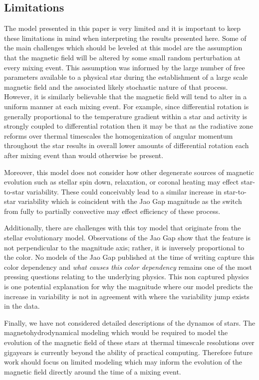 \subsection{Limitations}
The model presented in this paper is very limited and it is important to keep
these limitations in mind when interpreting the results presented here. Some of
the main challenges which should be leveled at this model are the assumption
that the magnetic field will be altered by some small random perturbation at
every mixing event. This assumption was informed by the large number of free
parameters available to a physical star during the establishment of a large
scale magnetic field and the associated likely stochastic nature of that
process. However, it is similarly believable that the magnetic field will tend
to alter in a uniform manner at each mixing event. For example, since
differential rotation is generally proportional to the temperature gradient
within a star and activity is strongly coupled to differential rotation then it
may be that as the radiative zone reforms over thermal timescales the
homogenization of angular momentum throughout the star results in overall lower
amounts of differential rotation each after mixing event than would otherwise
be present.

Moreover, this model does not consider how other degenerate sources of magnetic
evolution such as stellar spin down, relaxation, or coronal heating may effect
star-to-star variability. These could conceivably lead to a similar increase in
star-to-star variability which is coincident with the Jao Gap magnitude as the
switch from fully to partially convective may effect efficiency of these
process.

Additionally, there are challenges with this toy model that originate from the
stellar evolutionary model. Observations of the Jao Gap show that the feature
is not perpendicular to the magnitude axis; rather, it is inversely
proportional to the color. No models of the Jao Gap published at the time of
writing capture this color dependency and \textit{what causes this color
dependency} remains one of the most pressing questions relating to the
underlying physics. This non captured physics is one potential explanation for
why the magnitude where our model predicts the increase in variability is not
in agreement with where the variability jump exists in the data.

Finally, we have not considered detailed descriptions of the dynamos of stars.
The magnetohydrodynamical modeling which would be required to model the
evolution of the magnetic field of these stars at thermal timescale resolutions
over gigayears is currently beyond the ability of practical computing.
Therefore future work should focus on limited modeling which may inform the
evolution of the magnetic field directly around the time of a mixing event.
